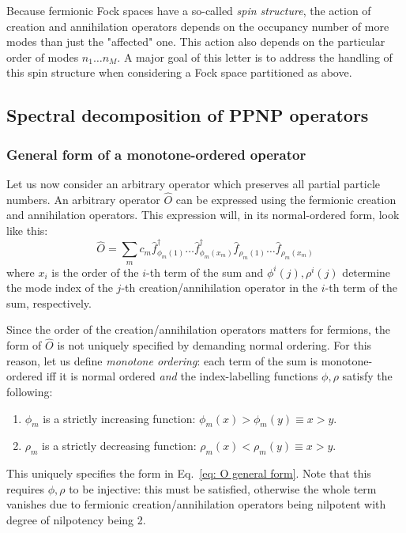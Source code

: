 \documentclass[12pt]{article}
\newcommand{\hc}{^\dagger}
\begin{document}
	Because fermionic Fock spaces have a so-called \textit{spin structure}, the action of creation and annihilation operators depends on the occupancy number of more modes than just the "affected" one. This action also depends on the particular order of modes $n_1 \dots n_M$. A major goal of this letter is to address the handling of this spin structure when considering a Fock space partitioned as above.
	
	\subsection{Spectral decomposition of PPNP operators}
	
	\subsubsection{General form of a monotone-ordered operator}
	Let us now consider an arbitrary operator which preserves all partial particle numbers. An arbitrary operator $\hat{O}$ can be expressed using the fermionic creation and annihilation operators. This expression will, in its normal-ordered form, look like this:
	\begin{equation} \label{eq: O general form}
	\hat{O} = \sum_{m} c_m \hat{f}_{\phi_m(1)}\hc \dots \hat{f}_{\phi_m(x_m)}\hc \hat{f}_{\rho_m(1)} \dots \hat{f}_{\rho_m(x_m)}
	\end{equation}
	where $x_i$ is the order of the $i$-th term of the sum and $\phi^i(j),\rho^i(j)$ determine the mode index of the $j$-th creation/annihilation operator in the $i$-th term of the sum, respectively.
	
	Since the order of the creation/annihilation operators matters for fermions, the form of $\hat{O}$ is not uniquely specified by demanding normal ordering. For this reason, let us define \textit{monotone ordering}: each term of the sum is monotone-ordered iff it is normal ordered \textit{and} the index-labelling functions $\phi, \rho$ satisfy the following:
	\begin{enumerate}
	\item $\phi_m$ is a strictly increasing function: $\phi_m(x) > \phi_m(y) \equiv x > y$.
	\item $\rho_m$ is a strictly decreasing function: $\rho_m(x) < \rho_m(y) \equiv x > y$.
	\end{enumerate}
	This uniquely specifies the form in Eq.~\eqref{eq: O general form}. Note that this requires $\phi, \rho$ to be injective: this must be satisfied, otherwise the whole term vanishes due to fermionic creation/annihilation operators being nilpotent with degree of nilpotency being 2.
	
\end{document}
